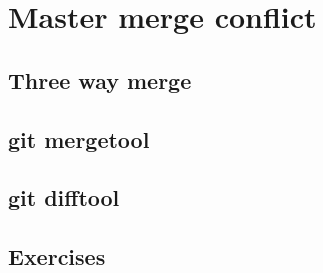 \section{Master merge conflict}
\begin{frame}[fragile]
    \slidetitle
\end{frame}

\subsection{Three way merge}
\begin{frame}[fragile]
    \subslidetitle
\end{frame}

\subsection{git mergetool}
\begin{frame}[fragile]
    \subslidetitle
\end{frame}

\subsection{git difftool}
\begin{frame}[fragile]
    \subslidetitle
\end{frame}

\subsection{Exercises}
\begin{frame}[fragile]
  \subslidetitle
\end{frame}
